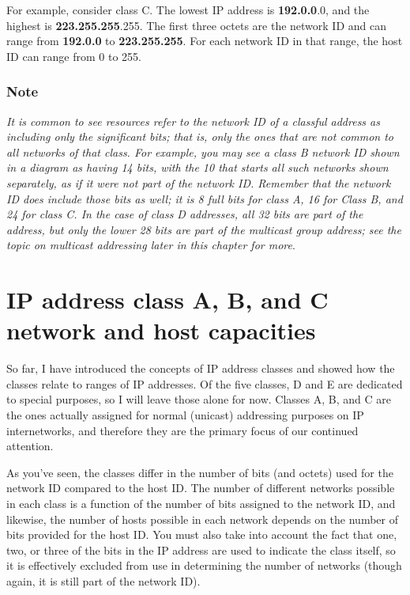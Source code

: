 \documentclass[b5paper,11pt]{memoir}
\begin{document}
For example, consider class C. The lowest IP address is
{\textbf{192.0.0}}.0, and the highest is {\textbf{223.255.255}}.255. The
first three octets are the network ID and can range from
{\textbf{192.0.0}} to {\textbf{223.255.255}}. For each network ID in
that range, the host ID can range from 0 to 255.

\subsubsection[Note]{\texorpdfstring{\protect\hypertarget{ch17s02.htmlux5cux23note-65}{}{}Note}{Note}}

{\emph{It is common to see resources refer to the network ID of a
classful address as including only the significant bits; that is, only
the ones that are not common to all networks of that class. For example,
you may see a class B network ID shown in a diagram as having 14 bits,
with the 10 that starts all such networks shown separately, as if it
were not part of the network ID. Remember that the network ID does
include those bits as well; it is 8 full bits for class A, 16 for Class
B, and 24 for class C. In the case of class D addresses, all 32 bits are
part of the address, but only the lower 28 bits are part of the
multicast group address; see the topic on multicast addressing later in
this chapter for more}}.


\section{IP address class A, B, and C network and host capacities}

So far, I have introduced the concepts of IP address classes and showed
how the classes relate to ranges of IP addresses. Of the five classes, D
and E are dedicated to special purposes, so I will leave those alone for
now. Classes A, B, and C are the ones actually assigned for normal
(unicast) addressing purposes on IP internetworks, and therefore they
are the primary focus of our continued attention.

As you've seen, the classes differ in the number of bits (and octets)
used for the network ID compared to the host ID. The number of different
networks possible in each class is a function of the number of bits
assigned to the network ID, and likewise, the number of hosts possible
in each network depends on the number of bits provided for the host ID.
You must also take into account the fact that one, two, or three of the
bits in the IP address are used to indicate the class itself, so it is
effectively excluded from use in determining the number of networks
(though again, it is still part of the network ID).
\end{document}
